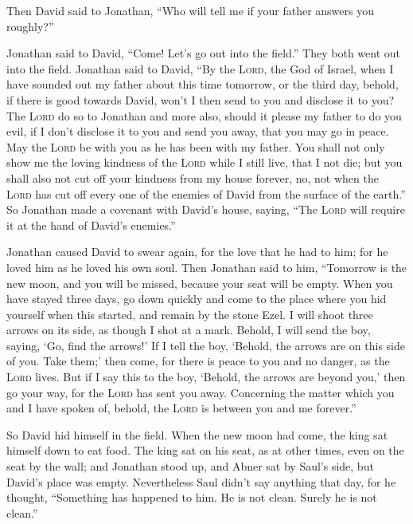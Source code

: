 Then David said to Jonathan, ``Who will tell me if your
father answers you roughly?''

 Jonathan said to David, ``Come! Let's go out into the
field.'' They both went out into the field.  Jonathan
said to David, ``By the \textsc{Lord}, the God of Israel, when I have
sounded out my father about this time tomorrow, or the third day,
behold, if there is good towards David, won't I then send to you and
disclose it to you?  The \textsc{Lord} do so to Jonathan
and more also, should it please my father to do you evil, if I don't
disclose it to you and send you away, that you may go in peace. May the
\textsc{Lord} be with you as he has been with my father. 
You shall not only show me the loving kindness of the \textsc{Lord}
while I still live, that I not die;  but you shall also
not cut off your kindness from my house forever, no, not when the
\textsc{Lord} has cut off every one of the enemies of David from the
surface of the earth.''  So Jonathan made a covenant with
David's house, saying, ``The \textsc{Lord} will require it at the hand
of David's enemies.''

 Jonathan caused David to swear again, for the love that
he had to him; for he loved him as he loved his own soul.
 Then Jonathan said to him, ``Tomorrow is the new moon,
and you will be missed, because your seat will be empty. 
When you have stayed three days, go down quickly and come to the place
where you hid yourself when this started, and remain by the stone Ezel.
 I will shoot three arrows on its side, as though I shot
at a mark.  Behold, I will send the boy, saying, `Go,
find the arrows!' If I tell the boy, `Behold, the arrows are on this
side of you. Take them;' then come, for there is peace to you and no
danger, as the \textsc{Lord} lives.  But if I say this to
the boy, `Behold, the arrows are beyond you,' then go your way, for the
\textsc{Lord} has sent you away.  Concerning the matter
which you and I have spoken of, behold, the \textsc{Lord} is between you
and me forever.''

 So David hid himself in the field. When the new moon had
come, the king sat himself down to eat food.  The king
sat on his seat, as at other times, even on the seat by the wall; and
Jonathan stood up, and Abner sat by Saul's side, but David's place was
empty.  Nevertheless Saul didn't say anything that day,
for he thought, ``Something has happened to him. He is not clean. Surely
he is not clean.''

